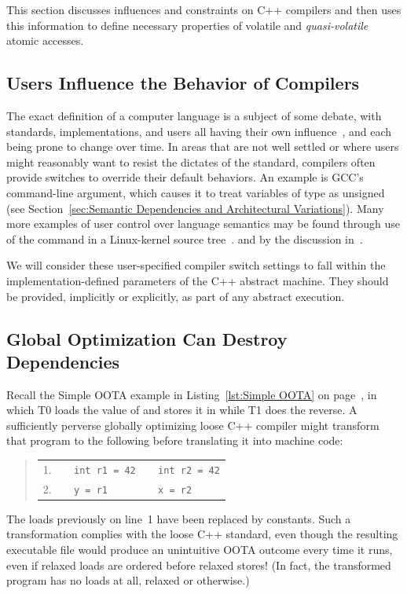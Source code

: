 This section discusses influences and constraints on C++ compilers
and then uses this information to define necessary properties of
volatile and \emph{quasi-volatile} atomic accesses.

\subsection{Users Influence the Behavior of Compilers}
\label{sec:Users Influence the Behavior of Compilers}

The exact definition of a computer language is a subject of some debate,
with standards, implementations, and users all having their own
influence~\cite{KayvanMemarian2016DepthOfC-1,KayvanMemarian2016DepthOfC-2},
and each being prone to change over time.
In areas that are not well settled or where users might reasonably
want to resist the dictates of the standard,
compilers often provide switches to override their default behaviors.
An example is GCC's  command-line argument,
which causes it to treat variables of type  as unsigned
(see Section~\ref{sec:Semantic Dependencies and Architectural Variations}).
Many more examples of user control over language semantics
may be found through use of the command 
in a Linux-kernel source
tree~\cite[Appendix B]{PaulEMcKenney2023P3046R2/OOTAwithoutTrying}.
and by the discussion
in~\cite{KayvanMemarian2016DepthOfC-1,KayvanMemarian2016DepthOfC-2}.

We will consider these user-specified compiler switch settings to fall
within the implementation-defined parameters of the C++ abstract machine.
They should be provided, implicitly or explicitly, as part of any
abstract execution.

\subsection{Global Optimization Can Destroy Dependencies}
\label{sec:Global Optimization Can Destroy Dependencies}

Recall the Simple OOTA example in Listing~\ref{lst:Simple OOTA} on
page~\pageref{lst:Simple OOTA},
in which T0 loads the value of  and stores it in  while T1
does the reverse.
A sufficiently perverse globally optimizing loose C++ compiler might
transform that program to the following before translating it into
machine code:
\begin{quote}
\small
\begin{tabular}{r|l|l}
1. &
\texttt{~~int r1 = 42} &
	\texttt{~~int r2 = 42} \\
2. &
\texttt{~~y = r1} &
	\texttt{~~x = r2} \\
\end{tabular}
\end{quote}
The loads previously on line~1 have been replaced by constants.
Such a transformation complies with the loose C++ standard,
even though the resulting executable file would produce an unintuitive
OOTA outcome every time it runs, even if relaxed loads are ordered
before relaxed stores!
(In fact, the transformed program has no loads at all, relaxed or otherwise.)

